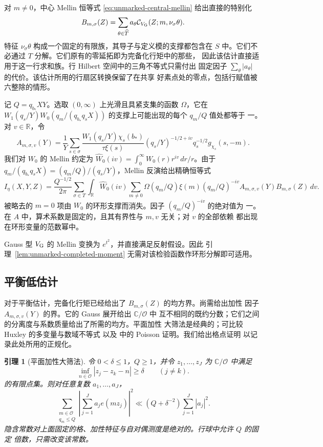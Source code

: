 \documentclass[11pt,a4paper]{article}
\numberwithin{equation}{section}
\numberwithin{figure}{section}
\newtheorem{lemma}[theorem]{引理}
\theoremstyle{definition}
\theoremstyle{remark}
\begin{document}
对 $m\ne0$，中心 Mellin 恒等式
\eqref{eq:unmarked-central-mellin} 给出直接的特别化
\[
 B_{m,\sigma}(Z)=\sum_{\theta\in\widehat T}a_\theta
       \mathcal C_{V_{\rm G}}(Z;m,\nu_\sigma\theta).
\]
特征 $\nu_\sigma\theta$ 构成一个固定的有限族，其导子与定义模的支撑都包含在
$S$ 中。它们不必通过 $T$ 分解。它们原有的零延拓即为完备化行矩中的那些，
因此该估计直接适用于这一行求和族。行 Hilbert 空间中的三角不等式只需付出
固定因子 $\sum_\theta|a_\theta|$ 的代价。该估计所用的行扇区转换保留了在共享
好素点处的零点，包括行赋值被六整除的情形。

记 $Q=q_{b_*}XY$。选取 $(0,\infty)$ 上光滑且具紧支集的函数 $\Omega$，它在
$W_1(q_s/Y)W_0(q_m/(q_{b_*}q_sX))$ 的支撑上可能出现的每个 $q_m/Q$ 值处都等于
一。对 $v\in\mathbb R$，令
\[
 A_{m,\sigma,v}(Y)=\frac1Y\sum_{s\in\sigma}
 \frac{W_1(q_s/Y)\chi_s(b_*)}{\tau\xi(s)}
 (q_s/Y)^{-1/2+iv}q_s^{-1/2}g_{\chi_s}(s,-m).
\]
我们对 $W_0$ 的 Mellin 约定为
$\widehat W_0(iv)=\int_0^\infty W_0(r)r^{iv}\,dr/r$。由于
$q_m/(q_{b_*}q_sX)=(q_m/Q)/(q_s/Y)$，Mellin 反演给出精确恒等式
\begin{equation}\label{eq:low-separated}
 I_\eta(X,Y,Z)=\frac{Q^{-1/2}}{2\pi}
 \sum_{\sigma\in T}\int_{\mathbb R}\widehat W_0(iv)
 \sum_{m\ne0}\Omega(q_m/Q)\xi(m)(q_m/Q)^{-iv}
                 A_{m,\sigma,v}(Y)B_{m,\sigma}(Z)\,dv.
\end{equation}
被略去的 $m=0$ 项由 $W_0$ 的环形支撑而消失。因子 $(q_m/Q)^{-iv}$ 的绝对值为
一。在 $A$ 中，算术系数是固定的，且其有界性与 $m,v$ 无关；对 $v$ 的全部依赖
都出现在环形变量的范数幂中。

Gauss 型 $V_{\rm G}$ 的 Mellin 变换为 $e^{t^2}$，并直接满足反射假设。因此
引理~\ref{lem:unmarked-completed-moment} 无需对该检验函数作环形分解即可适用。

\subsection{平衡低估计}

对于平衡估计，完备化行矩已经给出了 $B_{m,\sigma}(Z)$ 的均方界。尚需给出加性
因子 $A_{m,\sigma,v}(Y)$ 的界。它的 Gauss 展开给出 $\mathbb C/\mathcal O$ 中
互不相同的既约分数；它们之间的分离度与系数质量给出了所需的均方。平面加性
大筛法是经典的；可比较 Huxley 的多变量与数域不等式 \cite{Huxley} 以及
\cite[第~3 节，定理~3]{BaierBansal} 中的 Poisson 证明。我们给出格点证明
以记录此处所用的正规化。

\begin{lemma}[平面加性大筛法]
\label{lem:planar-additive-sieve}
令 $0<\delta\le1$，$Q\ge1$，并令 $z_1,\ldots,z_J$ 为 $\mathbb C/\mathcal O$
中满足
\[
 \inf_{n\in\mathcal O}|z_j-z_k-n|\ge\delta
 \qquad(j\ne k).
\]
的有限点集。则对任意复数 $a_1,\ldots,a_J$，
\[
 \sum_{\substack{m\in\mathcal O\\q_m\le Q}}
 \left|\sum_{j=1}^J a_j e(mz_j)\right|^2
 \ll (Q+\delta^{-2})\sum_{j=1}^J|a_j|^2.
\]
隐含常数对上面固定的格、加性特征与自对偶测度是绝对的。行球中允许 $Q$ 的固定
倍数，只需改变该常数。
\end{lemma}
\end{document}
